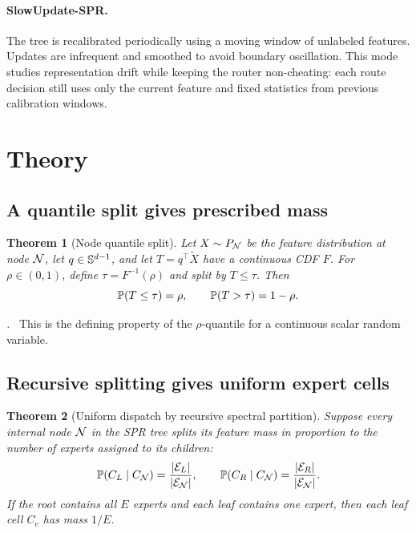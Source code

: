 \documentclass{article}
\newtheorem{theorem}{Theorem}
\renewenvironment{proof}[1][\proofname]{\par\noindent\textit{#1.}\ }{\hfill\qedsymbol\par}
\begin{document}
\paragraph{SlowUpdate-SPR.}
The tree is recalibrated periodically using a moving window of unlabeled
features.  Updates are infrequent and smoothed to avoid boundary oscillation.
This mode studies representation drift while keeping the router non-cheating:
each route decision still uses only the current feature and fixed statistics from
previous calibration windows.

\section{Theory}

\subsection{A quantile split gives prescribed mass}

\begin{theorem}[Node quantile split]
\label{thm:quantile_split}
Let $X\sim P_{\mathcal{N}}$ be the feature distribution at node $\mathcal{N}$, let
$q\in\mathbb{S}^{d-1}$, and let $T=q^{\top}\tilde X$ have a continuous CDF $F$.
For $\rho\in(0,1)$, define $\tau=F^{-1}(\rho)$ and split by
$T\le \tau$.  Then
\begin{equation}
 \mathbb{P}(T\le \tau)=\rho,\qquad \mathbb{P}(T>\tau)=1-\rho.
\end{equation}
\end{theorem}

\begin{proof}
This is the defining property of the $\rho$-quantile for a continuous scalar
random variable.
\end{proof}

\subsection{Recursive splitting gives uniform expert cells}

\begin{theorem}[Uniform dispatch by recursive spectral partition]
\label{thm:recursive_uniform}
Suppose every internal node $\mathcal{N}$ in the SPR tree splits its feature mass in
proportion to the number of experts assigned to its children:
\begin{equation}
 \mathbb{P}(C_L\mid C_{\mathcal{N}})=\frac{|\mathcal{E}_L|}{|\mathcal{E}_{\mathcal{N}}|},\qquad
 \mathbb{P}(C_R\mid C_{\mathcal{N}})=\frac{|\mathcal{E}_R|}{|\mathcal{E}_{\mathcal{N}}|}.
\end{equation}
If the root contains all $E$ experts and each leaf contains one expert, then each
leaf cell $C_e$ has mass $1/E$.
\end{theorem}
\end{document}
